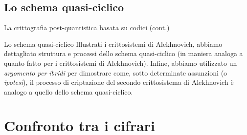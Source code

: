 \documentclass[10pt]{beamer}
\begin{document}
		\subsection{Lo schema quasi-ciclico}
			\begin{frame}{La crittografia post-quantistica basata su codici (cont.)}
				\begin{block}{Lo schema quasi-ciclico}
					Illustrati i crittosistemi di Alekhnovich, abbiamo dettagliato struttura e processi dello schema quasi-ciclico (in maniera analoga a quanto fatto per i crittosistemi di Alekhnovich). Infine, abbiamo utilizzato un \emph{argomento per ibridi} per dimostrare come, sotto determinate assunzioni (o \emph{ipotesi}), il processo di criptazione del secondo crittosistema di Alekhnovich è analogo a quello dello schema quasi-ciclico.
				\end{block}
			\end{frame}
	\section{Confronto tra i cifrari}
\end{document}
